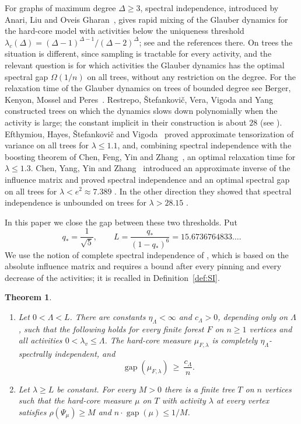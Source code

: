 \documentclass{amsart}
\numberwithin{equation}{section}
\numberwithin{table}{section}
\newtheorem{theorem}{Theorem}[section]
\theoremstyle{definition}
\theoremstyle{remark}
\newcommand{\gap}{\operatorname{gap}}
\newcommand{\qs}{q_{\ast}}
\begin{document}
For graphs of maximum degree $\Delta\ge3$, spectral independence, introduced by Anari, Liu and Oveis Gharan~\cite{ALO}, gives rapid mixing of the Glauber dynamics for the hard-core model with activities below the uniqueness threshold $\lambda_c(\Delta)=(\Delta-1)^{\Delta-1}/(\Delta-2)^{\Delta}$; see \cite{ALO,CFYZ,CLV} and the references there. On trees the situation is different, since sampling is tractable for every activity, and the relevant question is for which activities the Glauber dynamics has the optimal spectral gap $\Omega(1/n)$ on all trees, without any restriction on the degree. For the relaxation time of the Glauber dynamics on trees of bounded degree see Berger, Kenyon, Mossel and Peres~\cite{BKMP}. Restrepo, \v{S}tefankovi\v{c}, Vera, Vigoda and Yang~\cite{RSV} constructed trees on which the dynamics slows down polynomially when the activity is large; the constant implicit in their construction is about $28$ (see \cite[Section~1]{EHSV}). Efthymiou, Hayes, \v{S}tefankovi\v{c} and Vigoda~\cite{EHSV} proved approximate tensorization of variance on all trees for $\lambda\le 1.1$, and, combining spectral independence with the boosting theorem of Chen, Feng, Yin and Zhang~\cite[Theorem~1.9]{CFYZ}, an optimal relaxation time for $\lambda\le 1.3$. Chen, Yang, Yin and Zhang~\cite{CYYZ} introduced an approximate inverse of the influence matrix and proved spectral independence and an optimal spectral gap on all trees for $\lambda<e^2\approx 7.389$ \cite[Theorem~7]{CYYZ}. In the other direction they showed that spectral independence is unbounded on trees for $\lambda>28.15$ \cite[Theorem~8]{CYYZ}.

In this paper we close the gap between these two thresholds. Put
\begin{equation}\label{eq:L}
\qs=\frac{1}{\sqrt5},\qquad L=\frac{\qs}{(1-\qs)^6}=15.6736764833\ldots .
\end{equation}
We use the notion of complete spectral independence of \cite{CFYZ}, which is based on the absolute influence matrix and requires a bound after every pinning and every decrease of the activities; it is recalled in Definition~\ref{def:SI}.

\begin{theorem}\label{thm:main}
\begin{enumerate}
\item[(a)] Let $0<\Lambda<L$. There are constants $\eta_\Lambda<\infty$ and $c_\Lambda>0$, depending only on $\Lambda$, such that the following holds for every finite forest $F$ on $n\ge1$ vertices and all activities $0<\lambda_v\le\Lambda$. The hard-core measure $\mu_{F,\lambda}$ is completely $\eta_\Lambda$-spectrally independent, and
\[
\gap(\mu_{F,\lambda})\ \ge\ \frac{c_\Lambda}{n}.
\]
\item[(b)] Let $\lambda\ge L$ be constant. For every $M>0$ there is a finite tree $T$ on $n$ vertices such that the hard-core measure $\mu$ on $T$ with activity $\lambda$ at every vertex satisfies $\rho(\Psi_\mu)\ge M$ and $n\cdot\gap(\mu)\le 1/M$.
\end{enumerate}
\end{theorem}
\end{document}
